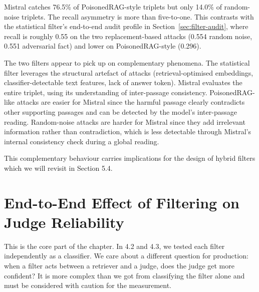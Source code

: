 \begin{table}[H]
\centering
\small
{}
\caption{Mistral triplet-level performance by injection type.}
\label{tab:mistral-filter-by-injection}
\end{table}

Mistral catches 76.5\% of PoisonedRAG-style triplets but only 14.0\% of random-noise triplets. The recall asymmetry is more than five-to-one. This contrasts with the statistical filter's end-to-end audit profile in Section~\ref{sec:filter-audit}, where recall is roughly 0.55 on the two replacement-based attacks (0.554 random noise, 0.551 adversarial fact) and lower on PoisonedRAG-style (0.296).

The two filters appear to pick up on complementary phenomena. The statistical filter leverages the structural artefact of attacks (retrieval-optimised embeddings, classifier-detectable text features, lack of answer token). Mistral evaluates the entire triplet, using its understanding of inter-passage consistency. PoisonedRAG-like attacks are easier for Mistral since the harmful passage clearly contradicts other supporting passages and can be detected by the model's inter-passage reading. Random-noise attacks are harder for Mistral since they add irrelevant information rather than contradiction, which is less detectable through Mistral's internal consistency check during a global reading.

This complementary behaviour carries implications for the design of hybrid filters which we will revisit in Section 5.4.

\section{End-to-End Effect of Filtering on Judge Reliability}

This is the core part of the chapter. In 4.2 and 4.3, we tested each filter independently as a classifier. We care about a different question for production: when a filter acts between a retriever and a judge, does the judge get more confident? It is more complex than we got from classifying the filter alone and must be considered with caution for the measurement.

